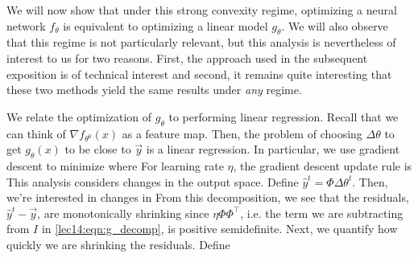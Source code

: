 We will now show that under this strong convexity regime, optimizing a neural network $f_\theta$ is equivalent to optimizing a linear model $g_\theta$. We will also observe that this regime is not particularly relevant, but this analysis is nevertheless of interest to us for two reasons. First, the approach used in the subsequent exposition is of technical interest and second, it remains quite interesting that these two methods yield the same results under \emph{any} regime. 

We relate the optimization of $g_\theta$ to performing linear regression. Recall that we can think of $\nabla f_{\theta^0}(x)$ as a feature map. Then, the problem of choosing $\Delta \theta$ to get $g_\theta(x)$ to be close to $\vec{y}$ is a linear regression. In particular, we use gradient descent to minimize
where 
For learning rate $\eta$, the gradient descent update rule is 
This analysis considers changes in the output space. Define $\hat{y}^t = \Phi \Delta \theta^t$. Then, we're interested in changes in 
From this decomposition, we see that the residuals, $\hat{y}^t - \vec{y}$, are monotonically shrinking since $\eta \Phi \Phi^\top$, i.e. the term we are subtracting from $I$ in \eqref{lec14:eqn:g_decomp}, is positive semidefinite. Next, we quantify how quickly we are shrinking the residuals. Define 
